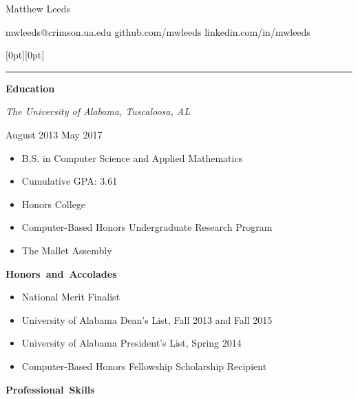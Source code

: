 \documentclass[11pt]{article}
\begin{document}
\centerline{\huge Matthew Leeds}
\vspace{0.4em}
\centerline{\normalsize mwleeds@crimson.ua.edu \space \textbar \space github.com/mwleeds \space \textbar \space linkedin.com/in/mwleeds}

\noindent \begin{minipage}[t]{\textwidth}
\raisebox{9pt}[0pt][0pt]{\rule{\textwidth}{0.2mm}\hspace{-\textwidth}}
\end{minipage}

\vspace{0.8em}
\hbox{\large \textbf{Education}}

\begin{minipage}[t]{0.7\textwidth}
\flushleft
\textit{The University of Alabama, Tuscaloosa, AL}\\
\end{minipage}
\begin{minipage}[t]{0.25\textwidth}
\flushright
August 2013 \space \textemdash \space May 2017\\
\end{minipage}

\begin{itemize}
  \item B.S. in Computer Science and Applied Mathematics
  \item Cumulative GPA: 3.61
  \item Honors College
  \item Computer-Based Honors Undergraduate Research Program
  \item The Mallet Assembly
\end{itemize}

\vspace{0.8em}
\hbox{\large \textbf{Honors and Accolades}}

\begin{itemize}
  \item National Merit Finalist
  \item University of Alabama Dean's List, Fall 2013 and Fall 2015
  \item University of Alabama President's List, Spring 2014
  \item Computer-Based Honors Fellowship Scholarship Recipient
\end{itemize}

\vspace{0.8em}
\hbox{\large \textbf{Professional Skills}}
\end{document}
